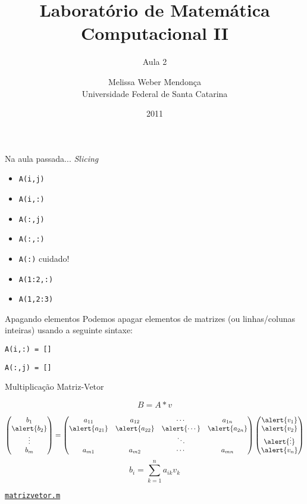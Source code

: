 \documentclass[hyperref={pdfpagelabels=false}]{beamer}
\title{Laboratório de Matemática Computacional II}
\subtitle{Aula 2}
\author[M. Weber Mendonça]{Melissa Weber Mendonça\\
Universidade Federal de Santa Catarina}
\date{2011}
\begin{document}
\setmonofont{Inconsolata}

\begin{frame}
  \titlepage
\end{frame}

\begin{frame}{Na aula passada...}
  {\emph{Slicing}}
  \begin{itemize}
  \item {\texttt{A(i,j)}}
  \item {\texttt{A(i,:)}}
  \item {\texttt{A(:,j)}}
  \item {\texttt{A(:,:)}}
  \item {\texttt{A(:)}} \alert{cuidado!}
  \item {\texttt{A(1:2,:)}}
  \item {\texttt{A(1,2:3)}}
  \end{itemize}
\end{frame}

\begin{frame}{Apagando elementos}
  Podemos apagar elementos de matrizes (ou linhas/colunas inteiras) usando a seguinte sintaxe:
  
  \begin{center} {\texttt{A(i,:) = []}} \end{center}
  \begin{center} {\texttt{A(:,j) = []}} \end{center}
\end{frame}

\begin{frame}{Multiplicação Matriz-Vetor}
  
  $$B = A*v$$
  
  \begin{equation*}
    \begin{pmatrix}
		  b_1\\
		  \alert{b_2}\\
		  \vdots\\
		  b_m
    \end{pmatrix}
    =
    \begin{pmatrix} 
      a_{11} & a_{12} & \cdots & a_{1n}\\ 
      \alert{a_{21}} & \alert{a_{22}} & \alert{\cdots} &
      \alert{a_{2n}}\\
      & & \ddots & \\ 
      a_{m1} & a_{m2} & \cdots & a_{mn} 
    \end{pmatrix}
    \begin{pmatrix}
      \alert{v_1}\\
      \alert{v_2}\\
      \alert{\vdots}\\
      \alert{v_n}
    \end{pmatrix}
  \end{equation*}
  \vfill
  $$b_i = \sum_{k=1}^n a_{ik}v_k$$
  \begin{center} \href{listings/matrizvetor.m}{\underline{\texttt{matrizvetor.m}}} \end{center}
\end{frame}
\end{document}
